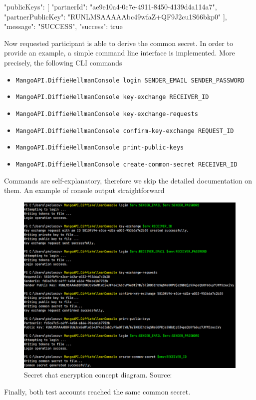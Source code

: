 \begin{spverbatim}
{
    "publicKeys": [
        {
            "partnerId": "ae9e10a4-0c7e-4911-8450-4139d4a114a7",
            "partnerPublicKey": "RUNLMSAAAAAbc49wfaZ+QF9J2cu1S66bkp0"
        }
    ],
    "message": "SUCCESS",
    "success": true
}
\end{spverbatim}
Now requested participant is able to derive the common secret.
In order to provide an example, a simple command line interface is implemented.
More precisely, the following CLI commands
\begin{itemize}
    \item \texttt{MangoAPI.DiffieHellmanConsole login SENDER\_EMAIL SENDER\_PASSWORD}
    \item \texttt{MangoAPI.DiffieHellmanConsole key-exchange RECEIVER\_ID}
    \item \texttt{MangoAPI.DiffieHellmanConsole key-exchange-requests}
    \item \texttt{MangoAPI.DiffieHellmanConsole confirm-key-exchange REQUEST\_ID}
    \item \texttt{MangoAPI.DiffieHellmanConsole print-public-keys}
    \item \texttt{MangoAPI.DiffieHellmanConsole create-common-secret RECEIVER\_ID}
\end{itemize}
Commands are self-explanatory, therefore we skip the detailed documentation on them.
An example of console output straightforward
\begin{figure}[H]
    \centering
    \includegraphics[width=1\textwidth]{Pictures/KeyExhangeConsole2}
    \caption{Secret chat encryption concept diagram. Source: }\label{fig:figure7}
\end{figure}
Finally, both test accounts reached the same common secret.